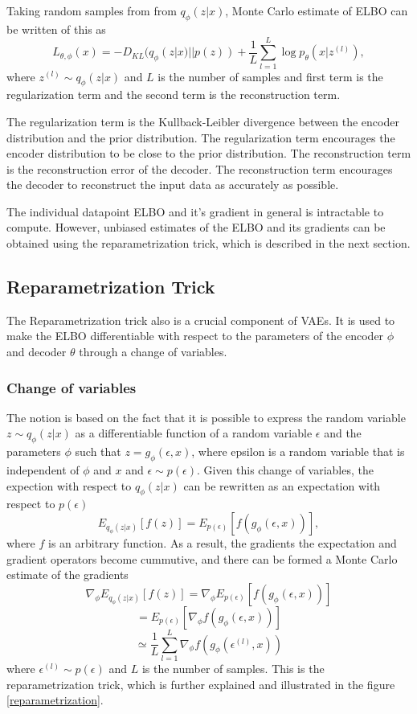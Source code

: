 Taking random samples from from $q_{\phi}(z|x)$, Monte Carlo estimate of ELBO can be written of this as
\[ L_{\theta, \phi}(x) = - D_{KL}(q_{\phi}(z|x) || p(z)) + \frac{1}{L} \sum_{l=1}^{L} \log p_{\theta}(x|z^{(l)}) ,\]
where $z^{(l)} \sim q_{\phi}(z|x)$ and $L$ is the number of samples and first term is the regularization term and the second term is the reconstruction term\cite{Kingma_2019}. 

The regularization term is the Kullback-Leibler divergence between the encoder distribution and the prior distribution. The regularization term encourages the encoder distribution to be close to the prior distribution. The reconstruction term is the reconstruction error of the decoder. The reconstruction term encourages the decoder to reconstruct the input data as accurately as possible.

The individual datapoint ELBO and it's gradient in general is intractable to compute. However, unbiased estimates of the ELBO and its gradients can be obtained using the reparametrization trick, which is described in the next section\cite{Kingma_2019}.


\subsection{Reparametrization Trick}

The Reparametrization trick also  is a crucial component of VAEs. It is used to make the ELBO differentiable with respect to the parameters of the encoder $\phi$ and decoder $\theta$ through a change of variables.\cite{Kingma_2019}

\subsubsection{Change of variables}

The notion is based on the fact that it is possible to express the random variable $z \sim q_{\phi}(z|x)$ as a differentiable function of a random variable $\epsilon$ and the parameters $\phi$ such that $z = g_{\phi}(\epsilon, x)$, where epsilon is a random variable that is independent of $\phi$ and $x$ and $\epsilon \sim p(\epsilon)$. Given this change of variables, the expection with respect to $q_{\phi}(z|x)$ can be rewritten as an expectation with respect to $p(\epsilon)$
\[ E_{q_{\phi}(z|x)}[f(z)] = E_{p(\epsilon)}[f(g_{\phi}(\epsilon, x))], \]
where $f$ is an arbitrary function.\cite{Kingma_2019}
As a result, the gradients the expectation and gradient operators become cummutive, and there can be formed a Monte Carlo estimate of the gradients
\[ \nabla_{\phi} E_{q_{\phi}(z|x)}[f(z)] = \nabla_{\phi} E_{p(\epsilon)}[ f(g_{\phi}(\epsilon, x))] \]
\[ = E_{p(\epsilon)}[\nabla_{\phi} f(g_{\phi}(\epsilon, x))] \]
\[  \simeq \frac{1}{L} \sum_{l=1}^{L} \nabla_{\phi} f(g_{\phi}(\epsilon^{(l)}, x)) \]
where $\epsilon^{(l)} \sim p(\epsilon)$ and $L$ is the number of samples.
This is the reparametrization trick, which is further explained and illustrated in the figure \ref{reparametrization}.

